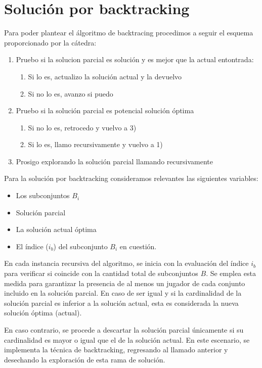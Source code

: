 \section{Solución por backtracking}

Para poder plantear el álgoritmo de backtracing procedimos a seguir el esquema proporcionado por la cátedra:
\begin{enumerate}
    \item Pruebo si la solucion parcial es solución y es mejor que la actual entontrada:
    \begin {enumerate}
        \item Si lo es, actualizo la solución actual y la devuelvo
        \item Si no lo es, avanzo si puedo
    \end{enumerate}
    \item Pruebo si la solución parcial es potencial solución óptima
    \begin {enumerate}
        \item Si no lo es, retrocedo y vuelvo a 3)
        \item Si lo es, llamo recursivamente y vuelvo a 1)
    \end{enumerate}
    \item Prosigo explorando la solución parcial llamando recursivamente
\end{enumerate}

Para la solución por backtracking consideramos relevantes las siguientes variables:
\begin{itemize}
    \item Los subconjuntos $B_i$
    \item Solución parcial
    \item La solución actual óptima 
    \item El índice ($i_b$) del subconjunto $B_i$ en cuestión. 
\end{itemize}

En cada instancia recursiva del algoritmo, se inicia con la evaluación del índice $i_b$ para verificar si coincide con la cantidad total de subconjuntos $B$. 
Se emplea esta medida para garantizar la presencia de al menos un jugador de cada conjunto incluido en la solución parcial.
En caso de ser igual y si la cardinalidad de la solución parcial es inferior a la solución actual, esta es considerada la nueva solución óptima (actual).

En caso contrario, se procede a descartar la solución parcial únicamente si su cardinalidad es mayor o igual que el de la solución actual. En este escenario, se implementa la técnica de backtracking, regresando al llamado anterior y desechando la exploración de esta rama de solución.

